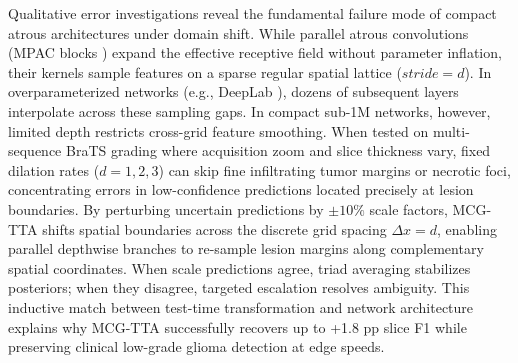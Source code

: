 Qualitative error investigations reveal the fundamental failure mode of compact atrous architectures under domain shift. While parallel atrous convolutions (MPAC blocks \cite{21}) expand the effective receptive field without parameter inflation, their kernels sample features on a sparse regular spatial lattice ($stride = d$). In overparameterized networks (e.g., DeepLab \cite{5}), dozens of subsequent layers interpolate across these sampling gaps. In compact sub-1M networks, however, limited depth restricts cross-grid feature smoothing. When tested on multi-sequence BraTS grading where acquisition zoom and slice thickness vary, fixed dilation rates ($d=1, 2, 3$) can skip fine infiltrating tumor margins or necrotic foci, concentrating errors in low-confidence predictions located precisely at lesion boundaries. By perturbing uncertain predictions by $\pm 10\%$ scale factors, MCG-TTA shifts spatial boundaries across the discrete grid spacing $\Delta x = d$, enabling parallel depthwise branches to re-sample lesion margins along complementary spatial coordinates. When scale predictions agree, triad averaging stabilizes posteriors; when they disagree, targeted escalation resolves ambiguity. This inductive match between test-time transformation and network architecture explains why MCG-TTA successfully recovers up to +1.8 pp slice F1 while preserving clinical low-grade glioma detection at edge speeds.
